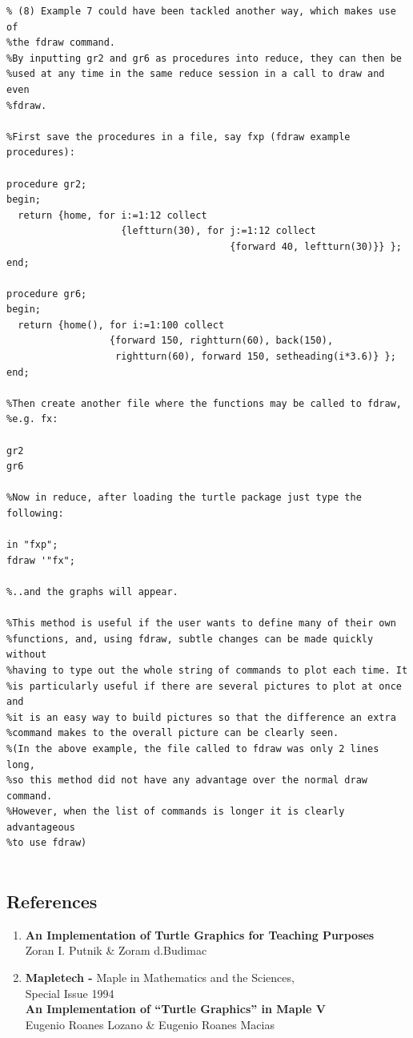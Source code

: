 \begin{verbatim}
% (8) Example 7 could have been tackled another way, which makes use of 
%the fdraw command.
%By inputting gr2 and gr6 as procedures into reduce, they can then be 
%used at any time in the same reduce session in a call to draw and even
%fdraw.

%First save the procedures in a file, say fxp (fdraw example procedures):

procedure gr2;
begin;
  return {home, for i:=1:12 collect
                    {leftturn(30), for j:=1:12 collect
                                       {forward 40, leftturn(30)}} };
end;

procedure gr6;
begin;
  return {home(), for i:=1:100 collect
                  {forward 150, rightturn(60), back(150),
                   rightturn(60), forward 150, setheading(i*3.6)} };
end;

%Then create another file where the functions may be called to fdraw,
%e.g. fx:

gr2
gr6

%Now in reduce, after loading the turtle package just type the following:

in "fxp";
fdraw '"fx";

%..and the graphs will appear.

%This method is useful if the user wants to define many of their own
%functions, and, using fdraw, subtle changes can be made quickly without 
%having to type out the whole string of commands to plot each time. It 
%is particularly useful if there are several pictures to plot at once and 
%it is an easy way to build pictures so that the difference an extra 
%command makes to the overall picture can be clearly seen.
%(In the above example, the file called to fdraw was only 2 lines long,
%so this method did not have any advantage over the normal draw command. 
%However, when the list of commands is longer it is clearly advantageous 
%to use fdraw)


\end{verbatim}


\subsection{References}

\begin{enumerate}
 \item {\bf An Implementation of Turtle Graphics for Teaching Purposes}\\
         Zoran I. Putnik \& Zoram d.Budimac

 \item {\bf Mapletech -} Maple in Mathematics and the Sciences,\\ 
        Special Issue 1994\\
       {\bf An Implementation of ``Turtle Graphics'' in Maple V}\\
         Eugenio Roanes Lozano \&  Eugenio Roanes Macias

\end{enumerate}



